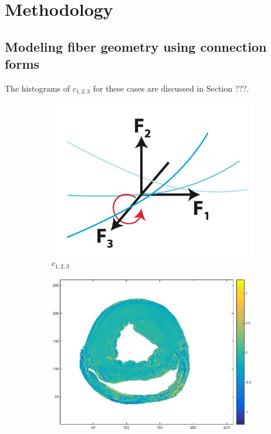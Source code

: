 \chapter{Methodology}

\section{Modeling fiber geometry using connection forms}

 The histograms of $c_{1,2,3}$ for these cases are discussed in Section ???. \\
\begin{figure}[h!]
    \centering
    \begin{subfigure}[h!]{0.3\textwidth}
        \centering
        \includegraphics[width=\textwidth]{figures/c123}
        \caption{$c_{1,2,3}$}
        \label{fig:c123theory}
    \end{subfigure}
    \hfill
    \begin{subfigure}[h!]{0.3\textwidth}
        \centering
        \includegraphics[width=\textwidth]{figures/pig4_c123_slice_19}

\end{subfigure}
\end{figure}
